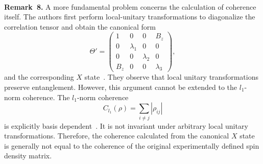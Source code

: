 \documentclass[epjc,twocolumn,nofootinbib,preprintnumbers,amsmath,amssymb]{revtex4-2}
\begin{document}
\\
\textbf{Remark~8.}
A more fundamental problem concerns the calculation of coherence itself.
The authors first perform local-unitary transformations to diagonalize the correlation tensor and obtain the canonical form
\begin{equation}
\Theta'
=
\begin{pmatrix}
1&0&0&B_z\\
0&\lambda_1&0&0\\
0&0&\lambda_2&0\\
B_z&0&0&\lambda_3
\end{pmatrix},
\end{equation}
and the corresponding $X$ state~\cite{Bachain}.
They observe that local unitary transformations preserve entanglement. However, this argument cannot be extended to the $l_1$-norm coherence.
The $l_1$-norm coherence
\begin{equation}
C_{l_1}(\rho)=\sum_{i\neq j}|\rho_{ij}|
\end{equation}
is explicitly basis dependent~\cite{Baumgratz2014}. It is not invariant under arbitrary local unitary transformations.
Therefore, the coherence calculated from the canonical $X$ state is generally not equal to the coherence of the original experimentally defined spin density matrix.
\end{document}
